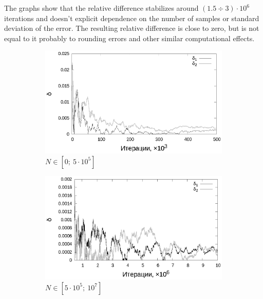 \documentclass[11pt,a4paper]{article}
\theoremstyle{definition}
\begin{document}
The graphs show that the relative difference stabilizes around $(1.5 \div 3) \cdot 10^6$
iterations and doesn't explicit dependence on the number of samples or standard
deviation of the error. The resulting relative difference is close to zero, but is
not equal to it probably to rounding errors and other similar computational effects.

\begin{figure}[h!]
  \begin{subfigure}[b]{0.3\textwidth}
    \includegraphics[width=\textwidth]{figs/classic/linear_log_1x_2_samples_10_variance_10_norm.log_0_500.eps}
    \caption{$N \in [0;~5 \cdot 10^5]$}
    \label{fig:classic_var10_n10_begin}
  \end{subfigure}
  \begin{subfigure}[b]{0.3\textwidth}
    \includegraphics[width=\textwidth]{figs/classic/linear_log_1x_2_samples_10_variance_10_norm.log_500_10000.eps}
    \caption{$N \in [5 \cdot 10^5;~10^7]$}
    \label{fig:classic_var10_n10_middle}
  \end{subfigure}
  \begin{subfigure}[b]{0.3\textwidth}

\end{subfigure}
\end{figure}
\end{document}
